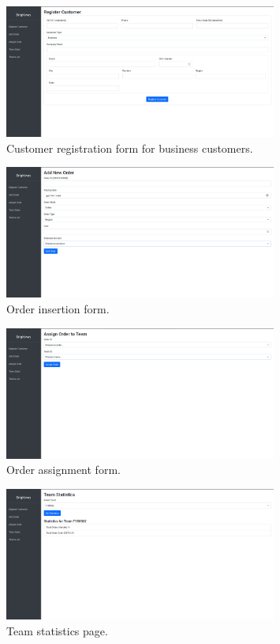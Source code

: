 \begin{figure}[H]
    \centering
    \includegraphics[width=0.8\textwidth]{img/web_app/customer_b.png}
    \caption{Customer registration form for business customers.}
\end{figure}

\begin{figure}[H]
    \centering
    \includegraphics[width=0.8\textwidth]{img/web_app/add.png}
    \caption{Order insertion form.}
\end{figure}

\begin{figure}[H]
    \centering
    \includegraphics[width=0.8\textwidth]{img/web_app/assign.png}
    \caption{Order assignment form.}
\end{figure}

\begin{figure}[H]
    \centering
    \includegraphics[width=0.8\textwidth]{img/web_app/stats.png}
    \caption{Team statistics page.}
\end{figure}

